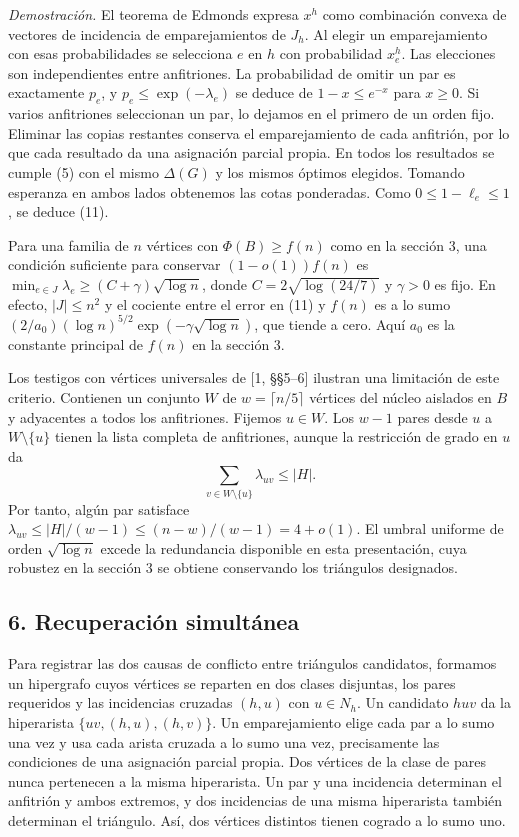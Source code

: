 \documentclass[spanish,11pt,a4paper]{article}
\begin{document}
\emph{Demostración.} El teorema de Edmonds expresa \(x^h\) como combinación convexa de vectores de incidencia de emparejamientos de \(J_h\). Al elegir un emparejamiento con esas probabilidades se selecciona \(e\) en \(h\) con probabilidad \(x^h_e\). Las elecciones son independientes entre anfitriones. La probabilidad de omitir un par es exactamente \(p_e\), y \(p_e\le\exp(-\lambda_e)\) se deduce de \(1-x\le e^{-x}\) para \(x\ge0\). Si varios anfitriones seleccionan un par, lo dejamos en el primero de un orden fijo. Eliminar las copias restantes conserva el emparejamiento de cada anfitrión, por lo que cada resultado da una asignación parcial propia. En todos los resultados se cumple (5) con el mismo \(\Delta(G)\) y los mismos óptimos elegidos. Tomando esperanza en ambos lados obtenemos las cotas ponderadas. Como \(0\le1-\ell_e\le1\), se deduce (11).

Para una familia de \(n\) vértices con \(\Phi(B)\ge f(n)\) como en la sección 3, una condición suficiente para conservar \((1-o(1))f(n)\) es \(\min_{e\in J}\lambda_e\ge(C+\gamma)\sqrt{\log n}\), donde \(C=2\sqrt{\log(24/7)}\) y \(\gamma>0\) es fijo. En efecto, \(|J|\le n^2\) y el cociente entre el error en (11) y \(f(n)\) es a lo sumo \((2/a_0)(\log n)^{5/2}\exp(-\gamma\sqrt{\log n})\), que tiende a cero. Aquí \(a_0\) es la constante principal de \(f(n)\) en la sección 3.

Los testigos con vértices universales de {[}1, §§5--6{]} ilustran una limitación de este criterio. Contienen un conjunto \(W\) de \(w=\lceil n/5\rceil\) vértices del núcleo aislados en \(B\) y adyacentes a todos los anfitriones. Fijemos \(u\in W\). Los \(w-1\) pares desde \(u\) a \(W\setminus\{u\}\) tienen la lista completa de anfitriones, aunque la restricción de grado en \(u\) da \[
\sum_{v\in W\setminus\{u\}}\lambda_{uv}\le |H|.
\] Por tanto, algún par satisface \(\lambda_{uv}\le |H|/(w-1)\le(n-w)/(w-1)=4+o(1)\). El umbral uniforme de orden \(\sqrt{\log n}\) excede la redundancia disponible en esta presentación, cuya robustez en la sección 3 se obtiene conservando los triángulos designados.

\subsection{6. Recuperación simultánea}\label{recuperaciuxf3n-simultuxe1nea}

Para registrar las dos causas de conflicto entre triángulos candidatos, formamos un hipergrafo cuyos vértices se reparten en dos clases disjuntas, los pares requeridos y las incidencias cruzadas \((h,u)\) con \(u\in N_h\). Un candidato \(huv\) da la hiperarista \(\{uv,(h,u),(h,v)\}\). Un emparejamiento elige cada par a lo sumo una vez y usa cada arista cruzada a lo sumo una vez, precisamente las condiciones de una asignación parcial propia. Dos vértices de la clase de pares nunca pertenecen a la misma hiperarista. Un par y una incidencia determinan el anfitrión y ambos extremos, y dos incidencias de una misma hiperarista también determinan el triángulo. Así, dos vértices distintos tienen cogrado a lo sumo uno.
\end{document}
